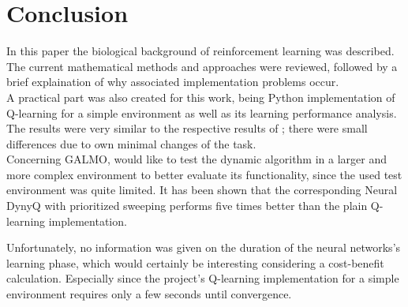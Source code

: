 \documentclass[a4paper]{article}
\begin{document}
	\section{Conclusion}
	\label{sec:conclusion}
	In this paper the biological background of reinforcement learning was described. The current mathematical methods and approaches were reviewed, followed by a brief explaination of why associated implementation problems occur. \\
	A practical part was also created for this work, being Python implementation of Q-learning for a simple environment as well as its learning performance analysis. The results were very similar to the respective results of \citet{NeuralDynaQ}; there were small differences due to own minimal changes of the task.\\
	Concerning GALMO, \citet{NeuralDynaQ} would like to test the dynamic algorithm in a larger and more complex environment to better evaluate its functionality, since the used test environment was quite limited. It has been shown that the corresponding Neural DynyQ with prioritized sweeping performs five times better than the plain Q-learning implementation.\\
	\par Unfortunately, no information was given on the duration of the neural networks's learning phase, which would certainly be interesting considering a cost-benefit calculation. Especially since the project's Q-learning implementation for a simple environment requires only a few seconds until convergence.
	
	
	\footnotesize
	
	
	\newpage
\end{document}
